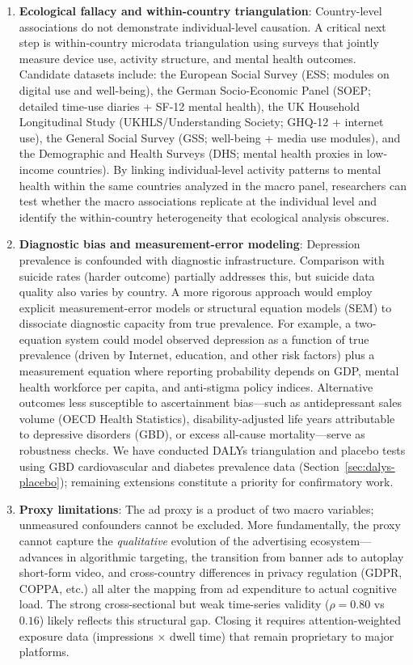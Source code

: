 \documentclass[a4paper,11pt,titlepage]{article}
\begin{document}
\begin{enumerate}
  \item \textbf{Ecological fallacy and within-country triangulation}: Country-level associations do not demonstrate individual-level causation. A critical next step is within-country microdata triangulation using surveys that jointly measure device use, activity structure, and mental health outcomes. Candidate datasets include: the European Social Survey (ESS; modules on digital use and well-being), the German Socio-Economic Panel (SOEP; detailed time-use diaries + SF-12 mental health), the UK Household Longitudinal Study (UKHLS/Understanding Society; GHQ-12 + internet use), the General Social Survey (GSS; well-being + media use modules), and the Demographic and Health Surveys (DHS; mental health proxies in low-income countries). By linking individual-level activity patterns to mental health within the same countries analyzed in the macro panel, researchers can test whether the macro associations replicate at the individual level and identify the within-country heterogeneity that ecological analysis obscures.
  \item \textbf{Diagnostic bias and measurement-error modeling}: Depression prevalence is confounded with diagnostic infrastructure. Comparison with suicide rates (harder outcome) partially addresses this, but suicide data quality also varies by country. A more rigorous approach would employ explicit measurement-error models or structural equation models (SEM) to dissociate diagnostic capacity from true prevalence. For example, a two-equation system could model observed depression as a function of true prevalence (driven by Internet, education, and other risk factors) plus a measurement equation where reporting probability depends on GDP, mental health workforce per capita, and anti-stigma policy indices. Alternative outcomes less susceptible to ascertainment bias---such as antidepressant sales volume (OECD Health Statistics), disability-adjusted life years attributable to depressive disorders (GBD), or excess all-cause mortality---serve as robustness checks. We have conducted DALYs triangulation and placebo tests using GBD cardiovascular and diabetes prevalence data (Section~\ref{sec:dalys-placebo}); remaining extensions constitute a priority for confirmatory work.
  \item \textbf{Proxy limitations}: The ad proxy is a product of two macro variables; unmeasured confounders cannot be excluded. More fundamentally, the proxy cannot capture the \emph{qualitative} evolution of the advertising ecosystem---advances in algorithmic targeting, the transition from banner ads to autoplay short-form video, and cross-country differences in privacy regulation (GDPR, COPPA, etc.) all alter the mapping from ad expenditure to actual cognitive load. The strong cross-sectional but weak time-series validity ($\rho = 0.80$ vs $0.16$) likely reflects this structural gap. Closing it requires attention-weighted exposure data (impressions $\times$ dwell time) that remain proprietary to major platforms.

\end{enumerate}
\end{document}
